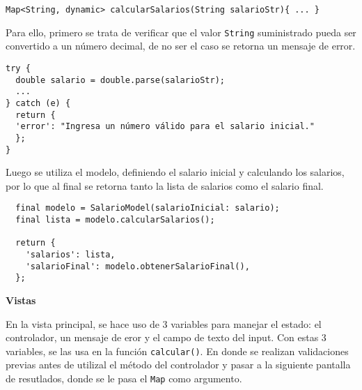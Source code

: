 \begin{center}
\begin{lstlisting}
Map<String, dynamic> calcularSalarios(String salarioStr){ ... }
\end{lstlisting}
\end{center}

Para ello, primero se trata de verificar que el valor \lstinline{String} suministrado pueda ser convertido a un número decimal, de no ser el caso se retorna un mensaje de error.

\begin{center}
\begin{lstlisting}
try {
  double salario = double.parse(salarioStr);
  ...
} catch (e) {
  return {
  'error': "Ingresa un número válido para el salario inicial."
  };
}
\end{lstlisting}
\end{center}

Luego se utiliza el modelo, definiendo el salario inicial y calculando los salarios, por lo que al final se retorna tanto la lista de salarios como el salario final.

\begin{center}
\begin{lstlisting}
  final modelo = SalarioModel(salarioInicial: salario);
  final lista = modelo.calcularSalarios();

  return {
    'salarios': lista,
    'salarioFinal': modelo.obtenerSalarioFinal(),
  };
\end{lstlisting}
\end{center}

\textbf{Vistas}

En la vista principal, se hace uso de 3 variables para manejar el estado: el controlador, un mensaje de eror y el campo de texto del input. Con estas 3 variables, se las usa en la función \lstinline{calcular()}. En donde se realizan validaciones previas antes de utilizal el método del controlador y pasar a la siguiente pantalla de resutlados, donde se le pasa el \lstinline{Map} como argumento.

